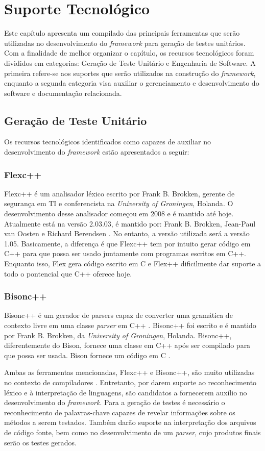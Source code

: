 \chapter[Suporte Tecnológico]{Suporte Tecnológico}
Este capítulo apresenta um compilado das principais ferramentas que serão utilizadas no desenvolvimento do \textit{framework} para geração de testes unitários. Com a finalidade de melhor organizar o capítulo, os recursos tecnológicos foram divididos em categorias: Geração de Teste Unitário e Engenharia de Software. A primeira refere-se aos suportes que serão utilizados na construção do \textit{framework}, enquanto a segunda categoria visa auxiliar o gerenciamento e desenvolvimento do software e documentação relacionada.

\section{Geração de Teste Unitário} \label{suporteGeracao}
Os recursos tecnológicos identificados como capazes de auxiliar no desenvolvimento do \textit{framework} estão apresentados a seguir:

\subsection{Flexc++}
Flexc++ é um analisador léxico escrito por Frank B. Brokken, gerente de segurança em TI e conferencista na \textit{University of Groningen}, Holanda\cite{flexcpp2015}. O desenvolvimento desse analisador começou em 2008 e é mantido até hoje. Atualmente está na versão 2.03.03, é mantido por: Frank B. Brokken, Jean-Paul van Oosten e Richard Berendsen \cite{flexcpp2015}. No entanto, a versão utilizada será a versão 1.05. Basicamente, a diferença é que Flexc++ tem por intuito gerar código em C++ para que possa ser usado juntamente com programas escritos em C++. Enquanto isso, Flex gera código escrito em C e Flex++ dificilmente dar suporte a todo o pontencial que C++ oferece hoje.

\subsection{Bisonc++}
Bisonc++ é um gerador de parsers capaz de converter uma gramática de contexto livre em uma classe \textit{parser} em C++ \cite{bisoncpp2015}. Bisonc++ foi escrito e é mantido por Frank B. Brokken, da \textit{University of Groningen}, Holanda. Bisonc++, diferentemente do Bison, fornece uma classe em C++ após ser compilado para que possa ser usada. Bison fornece um código em C \cite{bisoncpp2015}.
\par
\indent Ambas as ferramentas mencionadas, Flexc++ e Bisonc++, são muito utilizadas no contexto de compiladores \cite{aaby2004}. Entretanto, por darem suporte ao reconhecimento léxico e à interpretação de linguagens, são candidatos a fornecerem auxílio no desenvolvimento do \textit{framework}. Para a geração de testes é necessário o reconhecimento de palavras-chave capazes de revelar informações sobre os métodos a serem testados. Também darão suporte na interpretação dos arquivos de código fonte, bem como no desenvolvimento de um \textit{parser}, cujo produtos finais serão os testes gerados.


